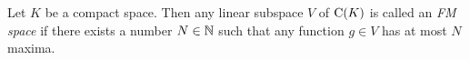 \begin{definition}[FM space]
Let $K$ be a compact space. Then any linear subspace $V$ of $\operatorname{C}(K)$ is called an \emph{FM space} if there exists a number $N\in\mathbb{N}$ such that any function $g\in V$ has at most $N$ maxima.
\end{definition}